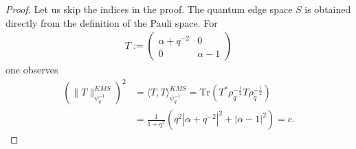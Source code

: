\documentclass{amsart}
\newcommand{\comments}[1]{}
\begin{document}
\begin{proof}
    Let us skip the indices in the proof.
    The quantum edge space $S$ is obtained directly from the definition of the Pauli space. For
    \begin{align*}
        T := \begin{pmatrix}
            \alpha + q^{-2} & 0 \\
            0 & \alpha - 1
        \end{pmatrix}
    \end{align*}
    one observes 
    \begin{align*}
        \left(\|T\|_{\psi_q^{-1}}^{KMS}\right)^2 &= \langle T, T \rangle_{\psi_q^{-1}}^{KMS} 
            = \mathrm{Tr}\left( T^\ast \rho_q^{-\frac{1}{2}} T \rho_q^{-\frac{1}{2}} \right)\\
            &= \frac{1}{1+q^2} \left( q^2 |\alpha+q^{-2}|^2 + |\alpha-1|^2 \right) 
            = c.
    \end{align*}
    \comments{
    \begin{align*}
        \left(\|T\|_{\psi_q^{-1}}^{KMS}\right)^2 &= \langle T, T \rangle_{\psi_q^{-1}}^{KMS} \\
            &= \mathrm{Tr}\left( T^\ast \rho_q^{-\frac{1}{2}} T \rho_q^{-\frac{1}{2}} \right) \\
            &= \frac{1}{1+q^2} \mathrm{Tr}\left( T^\ast \begin{pmatrix}
                q & 0 \\
                0 & 1
            \end{pmatrix}
            T
            \begin{pmatrix}
                q & 0 \\
                0 & 1
            \end{pmatrix} \right) \\
            &= \frac{1}{1+q^2} \mathrm{Tr} \left( \begin{pmatrix}
                 q(\overline{\alpha+q^{-2}}) & 0\\
                 0 & \overline{\alpha-1}
            \end{pmatrix}
            \begin{pmatrix}
                q(\alpha+q^{-2}) & 0 \\
                0 & \alpha-1
            \end{pmatrix} \right) \\
            &= \frac{1}{1+q^2} \mathrm{Tr} \left( \begin{pmatrix}

\end{pmatrix}
\end{align*}}
\end{proof}
\end{document}
